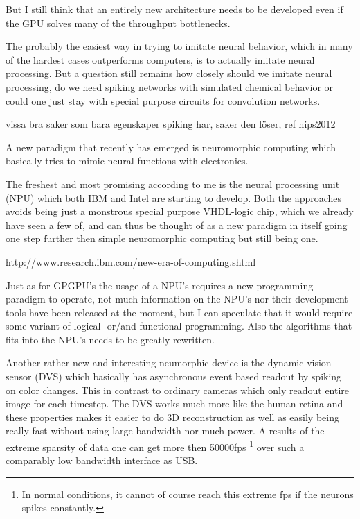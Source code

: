\documentclass{article}
\begin{document}
    But I still think that an entirely new architecture needs to be developed 
    even if the GPU solves many of the throughput bottlenecks.
    
    The probably the easiest way in trying to imitate neural behavior, 
    which in many of the hardest cases outperforms computers, is to actually
    imitate neural processing. But a question still remains how closely should
    we imitate neural processing, do we need spiking networks with simulated
    chemical behavior or could one just stay with special purpose circuits 
    for convolution networks.

    vissa bra saker som bara egenskaper spiking har, saker den löser, ref nips2012

    A new paradigm that recently has emerged is neuromorphic
    computing which basically tries to mimic neural functions with electronics.
    
    The freshest and most promising according to me is the 
    neural processing unit (NPU) which both IBM\cite{synapse} and
    Intel\cite{intelneuro} are starting to develop. Both the approaches avoids being
    just a monstrous special purpose VHDL-logic chip, which we already have
    seen a few of, and can thus be thought of
    as a new paradigm in itself going one step further then simple neuromorphic
    computing but still being one.

    http://www.research.ibm.com/new-era-of-computing.shtml 

    Just as for GPGPU's the usage of a NPU's requires a new programming paradigm to
    operate, not much information on the NPU's nor their development tools
    have been released at the moment, but I can speculate that it would
    require some variant of logical- or/and functional programming. 
    Also the algorithms that fits into the
    NPU's needs to be greatly rewritten.
    
    Another rather new and interesting neumorphic device is the
    dynamic vision sensor (DVS) which basically has asynchronous event based
    readout by spiking on color changes.\cite{dvs} This in contrast to ordinary
    cameras which only readout entire image for each timestep. 
    The DVS works much more like the human retina and
    these properties makes it easier to do 3D reconstruction as well as easily
    being really fast without using large bandwidth nor much power. A results
    of the extreme sparsity of data one can get more then 50000fps
    \footnote{In normal conditions, it cannot of course reach this extreme fps
    if the neurons spikes constantly.}
    over such a comparably low bandwidth interface as USB.
\end{document}

